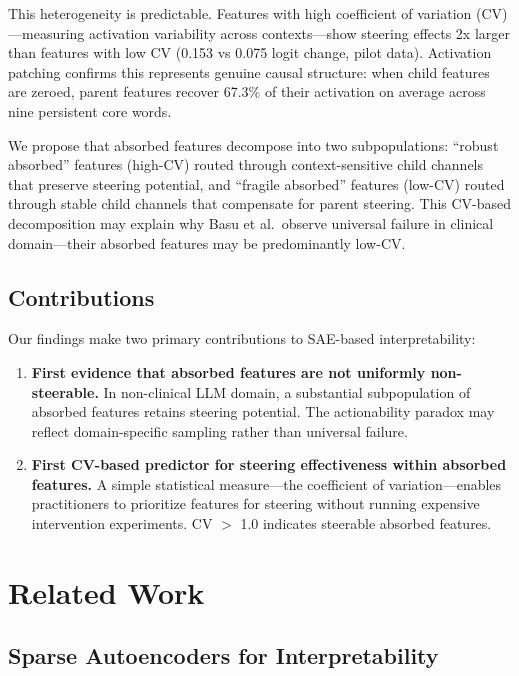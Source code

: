 \documentclass{article}
\begin{document}
This heterogeneity is predictable. Features with high coefficient of variation (CV)---measuring activation variability across contexts---show steering effects 2x larger than features with low CV (0.153 vs 0.075 logit change, pilot data). Activation patching confirms this represents genuine causal structure: when child features are zeroed, parent features recover 67.3\% of their activation on average across nine persistent core words.

We propose that absorbed features decompose into two subpopulations: ``robust absorbed'' features (high-CV) routed through context-sensitive child channels that preserve steering potential, and ``fragile absorbed'' features (low-CV) routed through stable child channels that compensate for parent steering. This CV-based decomposition may explain why Basu et al.\ observe universal failure in clinical domain---their absorbed features may be predominantly low-CV.

\subsection{Contributions}

Our findings make two primary contributions to SAE-based interpretability:

\begin{enumerate}
    \item \textbf{First evidence that absorbed features are not uniformly non-steerable.} In non-clinical LLM domain, a substantial subpopulation of absorbed features retains steering potential. The actionability paradox may reflect domain-specific sampling rather than universal failure.

    \item \textbf{First CV-based predictor for steering effectiveness within absorbed features.} A simple statistical measure---the coefficient of variation---enables practitioners to prioritize features for steering without running expensive intervention experiments. CV $>$ 1.0 indicates steerable absorbed features.
\end{enumerate}

\section{Related Work}

\subsection{Sparse Autoencoders for Interpretability}
\end{document}
